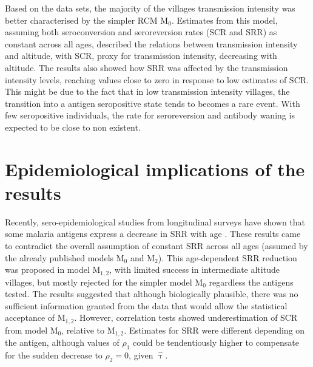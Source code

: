 Based on the data sets, the majority of the villages transmission intensity was better characterised by the simpler RCM M$_0$.
Estimates from this model, assuming both seroconversion and seroreversion rates (SCR and SRR) as constant across all ages, described the relations between transmission intensity and altitude, with SCR, proxy for transmission intensity, decreasing with altitude.
The results also showed how SRR was affected by the transmission intensity levels, reaching values close to zero in response to low estimates of SCR.
This might be due to the fact that in low transmission intensity villages, the transition into a antigen seropositive state tends to becomes a rare event.
With few seropositive individuals, the rate for seroreversion and antibody waning is expected to be close to non existent.

\section{Epidemiological implications of the results}

Recently, sero-epidemiological studies from longitudinal surveys have shown that some malaria antigens express a decrease in SRR with age \cite{ondigo2014estimation}. %
These results came to contradict the overall assumption of constant SRR across all ages (assumed by the already published models M$_0$ and M$_2$).
This age-dependent SRR reduction was proposed in model M$_{1,2}$, with limited success in intermediate altitude villages, but mostly rejected for the simpler model M$_0$ regardless the antigens tested.
The results suggested that although biologically plausible, there was no sufficient information granted from the data that would allow the statistical acceptance of M$_{1,2}$.
However, correlation tests showed underestimation of SCR from model M$_0$, relative to M$_{1,2}$.
Estimates for SRR were different depending on the antigen, although values of $ \widehat{\rho}_1$ could be tendentiously higher to compensate for the sudden decrease to $\rho_2=0$, given $ \widehat{\uptau}$.

